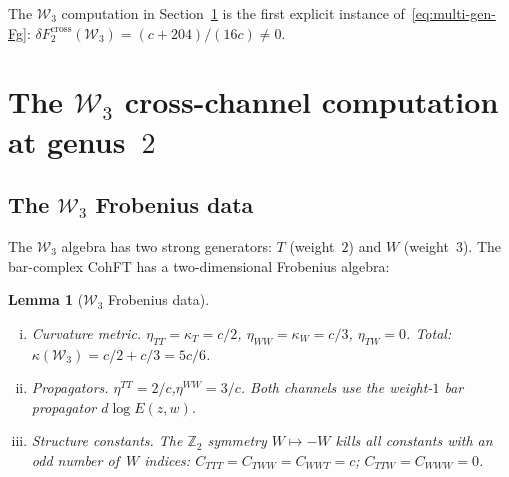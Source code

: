 \documentclass[11pt,reqno]{amsart}
\newtheorem{lemma}[theorem]{Lemma}
\theoremstyle{definition}
\theoremstyle{remark}
\newcommand{\cW}{\mathcal{W}}
\numberwithin{equation}{section}
\begin{document}
The $\cW_3$ computation in Section~\ref{sec:genus2} is the
first explicit instance of~\eqref{eq:multi-gen-Fg}:
$\delta F_2^{\mathrm{cross}}(\cW_3) = (c+204)/(16c) \ne 0$.



\section{The $\cW_3$ cross-channel computation at
genus~$2$}\label{sec:genus2}

\subsection{The $\cW_3$ Frobenius
data}\label{subsec:w3-frobenius}

The $\cW_3$ algebra has two strong generators:
$T$ (weight~$2$) and $W$ (weight~$3$). The
bar-complex CohFT has a two-dimensional Frobenius algebra:

\begin{lemma}[$\cW_3$ Frobenius
data]\label{lem:w3-frobenius}
\leavevmode
\begin{enumerate}[(i)]
\item \emph{Curvature metric.}\enspace
 $\eta_{TT} = \kappa_T = c/2$,
 $\eta_{WW} = \kappa_W = c/3$,
 $\eta_{TW} = 0$. Total:
 $\kappa(\cW_3) = c/2 + c/3 = 5c/6$.

\item \emph{Propagators.}\enspace
 $\eta^{TT} = 2/c$,\enspace $\eta^{WW} = 3/c$.
 Both channels use the weight-$1$ bar propagator
 $d\!\log E(z,w)$.

\item \emph{Structure constants.}\enspace
 The $\mathbb{Z}_2$ symmetry $W \mapsto -W$ kills all
 constants with an odd number of~$W$ indices:
 $C_{TTT} = C_{TWW} = C_{WWT} = c$;\enspace
 $C_{TTW} = C_{WWW} = 0$.
\end{enumerate}
\end{lemma}
\end{document}

